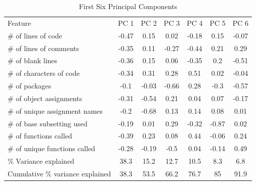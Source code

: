 \documentclass[12pt]{article}\usepackage[]{graphicx}\usepackage[]{color}
\begin{document}
\begin{table}[H]
\begin{tabular}{lcccccc} \toprule
Feature                                                 & PC 1 &  PC 2 & PC 3 & PC 4 & PC 5 & PC 6 \\ \cmidrule(lr){2-7}
\# of lines of code           &  -0.47 &  0.15 &  0.02 &  -0.18 &  0.15 &  -0.07                \\
\# of lines of comments       &  -0.35 &  0.11 &  -0.27 &  -0.44 &  0.21 &  0.29                \\
\# of blank lines             &  -0.36 &  0.15 &  0.06 &  -0.35 &  0.2 &  -0.51                \\
\# of characters of code      &  -0.34 &  0.31 &  0.28 &  0.51 &  0.02 &  -0.04                \\
\# of packages         &  -0.1 &  -0.03 &  -0.66 &  0.28 &  -0.3 &  -0.57                \\
\# of object assignments      &  -0.31 &  -0.54 &  0.21 &  0.04 &  0.07 &  -0.17                \\
\# of unique assignment names &  -0.2 &  -0.68 &  0.13 &  0.14 &  0.08 &  0.01                \\
\# of base subsetting used    &  -0.19 &  0.01 &  0.29 &  -0.32 &  -0.87 &  0.02                \\
\# of functions called        &  -0.39 &  0.23 &  0.08 &  0.44 &  -0.06 &  0.24                \\
\# of unique functions called &  -0.28 &  -0.19 &  -0.5 &  0.04 &  -0.14 &  0.49                \\ \midrule
\% Variance explained            &  38.3  &  15.2  &  12.7  &  10.5  &  8.3  &  6.8                 \\
Cumulative \% variance explained &  38.3 &  53.5  &  66.2  &  76.7  &  85  &  91.9     \\ \bottomrule
\end{tabular}
\caption{First Six Principal Components}
\end{table}
\end{document}
